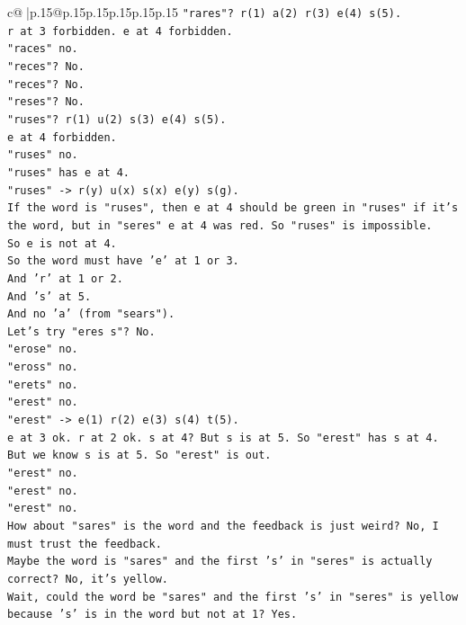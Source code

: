 \documentclass{article}
\begin{document}
{\begin{supertabular}{c@{$\;$}|p{.15\linewidth}@{}p{.15\linewidth}p{.15\linewidth}p{.15\linewidth}p{.15\linewidth}p{.15\linewidth}}
{{{\texttt{"rares"? r(1) a(2) r(3) e(4) s(5).} \\
\texttt{r at 3 forbidden. e at 4 forbidden.} \\
\texttt{"races" no.} \\
\texttt{"reces"? No.} \\
\texttt{"reces"? No.} \\
\texttt{"reses"? No.} \\
\texttt{"ruses"? r(1) u(2) s(3) e(4) s(5).} \\
\texttt{e at 4 forbidden.} \\
\texttt{"ruses" no.} \\
\texttt{"ruses" has e at 4.} \\
\texttt{"ruses" {-}> r(y) u(x) s(x) e(y) s(g).} \\
\texttt{If the word is "ruses", then e at 4 should be green in "ruses" if it's the word, but in "seres" e at 4 was red. So "ruses" is impossible.} \\
\texttt{So e is not at 4.} \\
\texttt{So the word must have 'e' at 1 or 3.} \\
\texttt{And 'r' at 1 or 2.} \\
\texttt{And 's' at 5.} \\
\texttt{And no 'a' (from "sears").} \\
\texttt{Let's try "eres s"? No.} \\
\texttt{"erose" no.} \\
\texttt{"eross" no.} \\
\texttt{"erets" no.} \\
\texttt{"erest" no.} \\
\texttt{"erest" {-}> e(1) r(2) e(3) s(4) t(5).} \\
\texttt{e at 3 ok. r at 2 ok. s at 4? But s is at 5. So "erest" has s at 4. But we know s is at 5. So "erest" is out.} \\
\texttt{"erest" no.} \\
\texttt{"erest" no.} \\
\texttt{"erest" no.} \\
\texttt{How about "sares" is the word and the feedback is just weird? No, I must trust the feedback.} \\
\texttt{Maybe the word is "sares" and the first 's' in "seres" is actually correct? No, it's yellow.} \\
\texttt{Wait, could the word be "sares" and the first 's' in "seres" is yellow because 's' is in the word but not at 1? Yes.} \\
}}}
\end{supertabular}}
\end{document}
